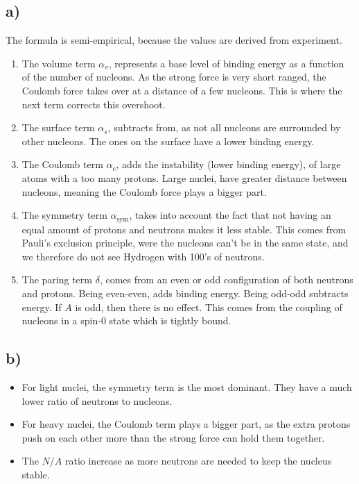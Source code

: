 \documentclass{article}
\begin{document}
\subsection*{a)}
The formula is semi-empirical, because the values are derived from experiment. 
\begin{enumerate}
  \item The volume term $α_{v}$, represents a base level of binding energy as a function of the number of nucleons. As the strong force is very short ranged, the Coulomb force takes over at a distance of a few nucleons. This is where the next term corrects this overshoot. 
  \item The surface term $α_s$, subtracts from, as not all nucleons are surrounded by other nucleons. The ones on the surface have a lower binding energy. 
  \item The Coulomb term $α_c$, adds the instability (lower binding energy), of large atoms with a too many protons. Large nuclei, have greater distance between nucleons, meaning the Coulomb force plays a bigger part. 
  \item The symmetry term $α_{\text{sym}}$, takes into account the fact that not having an equal amount of protons and neutrons makes it less stable. This comes from Pauli's exclusion principle, were the nucleons can't be in the same state, and we therefore do not see Hydrogen with 100's of neutrons. 
  \item The paring term $δ$, comes from an even or odd configuration of both neutrons and protons. Being even-even, adds binding energy. Being odd-odd subtracts energy. If $A$ is odd, then there is no effect. This comes from the coupling of nucleons in a spin-0 state which is tightly bound. 
\end{enumerate}

\subsection*{b)}
\begin{itemize}
  \item For light nuclei, the symmetry term is the most dominant. They have a much lower ratio of neutrons to nucleons. 
  \item For heavy nuclei, the Coulomb term plays a bigger part, as the extra protons push on each other more than the strong force can hold them together. 
  \item The $N/A$ ratio increase as more neutrons are needed to keep the nucleus stable. 
\end{itemize}
\end{document}
